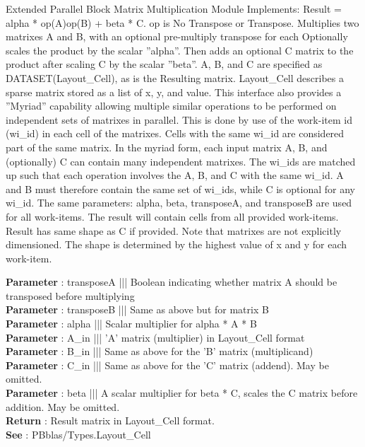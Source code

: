 \par
Extended Parallel Block Matrix Multiplication Module Implements: Result = alpha * op(A)op(B) + beta * C. op is No Transpose or Transpose. Multiplies two matrixes A and B, with an optional pre-multiply transpose for each Optionally scales the product by the scalar ''alpha''. Then adds an optional C matrix to the product after scaling C by the scalar ''beta''. A, B, and C are specified as DATASET(Layout\_Cell), as is the Resulting matrix. Layout\_Cell describes a sparse matrix stored as a list of x, y, and value. This interface also provides a ''Myriad'' capability allowing multiple similar operations to be performed on independent sets of matrixes in parallel. This is done by use of the work-item id (wi\_id) in each cell of the matrixes. Cells with the same wi\_id are considered part of the same matrix. In the myriad form, each input matrix A, B, and (optionally) C can contain many independent matrixes. The wi\_ids are matched up such that each operation involves the A, B, and C with the same wi\_id. A and B must therefore contain the same set of wi\_ids, while C is optional for any wi\_id. The same parameters: alpha, beta, transposeA, and transposeB are used for all work-items. The result will contain cells from all provided work-items. Result has same shape as C if provided. Note that matrixes are not explicitly dimensioned. The shape is determined by the highest value of x and y for each work-item.
\par
\textbf{Parameter} : transposeA ||| Boolean indicating whether matrix A should be transposed before multiplying \\
\textbf{Parameter} : transposeB ||| Same as above but for matrix B \\
\textbf{Parameter} : alpha ||| Scalar multiplier for alpha * A * B \\
\textbf{Parameter} : A\_in ||| 'A' matrix (multiplier) in Layout\_Cell format \\
\textbf{Parameter} : B\_in ||| Same as above for the 'B' matrix (multiplicand) \\
\textbf{Parameter} : C\_in ||| Same as above for the 'C' matrix (addend). May be omitted. \\
\textbf{Parameter} : beta ||| A scalar multiplier for beta * C, scales the C matrix before addition. May be omitted. \\
\textbf{Return} : Result matrix in Layout\_Cell format. \\
\textbf{See} : PBblas/Types.Layout\_Cell \\
